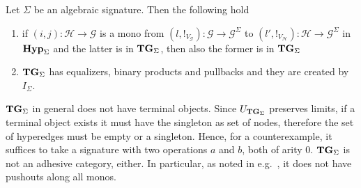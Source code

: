 \documentclass[3p]{elsarticle}
\newcommand{\Set}{\mathbf{Set}}
\newcommand{\catname}[1]{\textbf{\textup{#1}}}
\newcommand{\hyp}{\catname{Hyp}}
\newcommand{\tg}[0]{\catname{TG}_{\Sigma}}
\theoremstyle{remark}
\theoremstyle{definition}
\begin{document}
\begin{prop}\label{prop:tlim}
Let $\Sigma$ be an algebraic signature. Then the following hold
\begin{enumerate}
	\item if  $(i,j)\colon \mathcal{H}\to \mathcal{G}$ is a mono from $(l, !_{V_\mathcal{G}})\colon \mathcal{G}\to \mathcal{G}^{\Sigma}$ to $(l', !_{V_\mathcal{H}})\colon \mathcal{H}\to \mathcal{G}^{\Sigma}$ in $\hyp_\Sigma$ and the latter is in $\tg$, then also the former is in $\tg$
	\item $\tg$ has equalizers, binary products and pullbacks and they are created by $I_\Sigma$.
\end{enumerate}
\end{prop}

\begin{rem}
	$\tg$ in general does not have terminal objects. 
	Since $U_{\tg}$ preserves limits, if a terminal object exists it must have the singleton as set of nodes, therefore the set of hyperedges must be empty or a singleton. 
	Hence, for a counterexample, it suffices to take a signature with two operations $a$ and $b$, both of arity $0$.
	$\tg$ is not an adhesive category, either. 
	In particular, as noted in e.g.~\cite{CastelnovoGM24}, 
	 it does not have pushouts along all monos. 
\end{rem}
	
\end{document}
